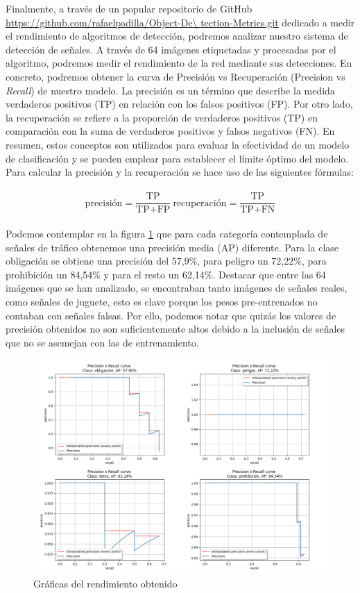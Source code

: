 Finalmente, a través de un popular repositorio de GitHub \url{https://github.com/rafaelpadilla/Object-De\ tection-Metrics.git} dedicado a medir el rendimiento de algoritmos de detección, podremos analizar nuestro sistema de detección de señales. A través de 64 imágenes etiquetadas y procesadas por el algoritmo, podremos medir el rendimiento de la red mediante sus detecciones. En concreto, podremos obtener la curva de Precisión vs Recuperación (Precision vs \textit{Recall}) de nuestro modelo. La precisión es un término que describe la medida verdaderos positivos (TP) en relación con los falsos positivos (FP). Por otro lado, la recuperación se refiere a la proporción de verdaderos positivos (TP) en comparación con la suma de verdaderos positivos y falsos negativos (FN). En resumen, estos conceptos son utilizados para evaluar la efectividad de un modelo de clasificación y se pueden emplear para establecer el límite óptimo del modelo.\\

Para calcular la precisión y la recuperación se hace uso de las siguientes fórmulas:\\
\\
$$\text{precisión} = \frac{\text{TP}}{\text{TP} + \text{FP}}\ \text{recuperación} = \frac{\text{TP}}{\text{TP} + \text{FN}}$$
\\

Podemos contemplar en la figura \ref{rendimiento} que para cada categoría contemplada de señales de tráfico obtenemos una precisión media (AP) diferente. Para la clase obligación se obtiene una precisión del 57,9\%, para peligro un 72,22\%, para prohibición un 84,54\% y para el resto un 62,14\%. Destacar que entre las 64 imágenes que se han analizado, se encontraban tanto imágenes de señales reales, como señales de juguete, esto es clave porque los pesos pre-entrenados no contaban con señales falsas. Por ello, podemos notar que quizás los valores de precisión obtenidos no son suficientemente altos debido a la inclusión de señales que no se asemejan con las de entrenamiento.\\


\begin{figure}[H]
    \centering
 	\includegraphics[width=\textwidth]{Imagenes/IA/rendimiento.pdf}
    \caption{Gráficas del rendimiento obtenido}
    \label{rendimiento}
\end{figure}